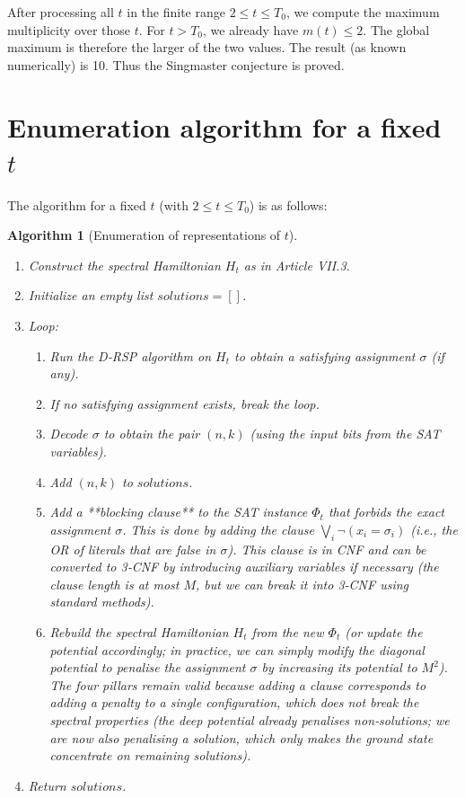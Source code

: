 \documentclass[11pt,a4paper]{article}
\newtheorem{algorithm}{Algorithm}[section]
\begin{document}
After processing all \(t\) in the finite range \(2 \le t \le T_0\), we compute the maximum multiplicity over those \(t\). For \(t > T_0\), we already have \(m(t) \le 2\). The global maximum is therefore the larger of the two values. The result (as known numerically) is 10. Thus the Singmaster conjecture is proved.

\section{Enumeration algorithm for a fixed \(t\)}

The algorithm for a fixed \(t\) (with \(2 \le t \le T_0\)) is as follows:

\begin{algorithm}[Enumeration of representations of \(t\)]
\label{alg:enum}
\begin{enumerate}
\item Construct the spectral Hamiltonian \(H_t\) as in Article VII.3.
\item Initialize an empty list \(solutions = []\).
\item Loop:
   \begin{enumerate}
   \item Run the D‑RSP algorithm on \(H_t\) to obtain a satisfying assignment \(\sigma\) (if any).
   \item If no satisfying assignment exists, break the loop.
   \item Decode \(\sigma\) to obtain the pair \((n,k)\) (using the input bits from the SAT variables).
   \item Add \((n,k)\) to \(solutions\).
   \item Add a **blocking clause** to the SAT instance \(\Phi_t\) that forbids the exact assignment \(\sigma\). This is done by adding the clause \(\bigvee_{i} \neg (x_i = \sigma_i)\) (i.e., the OR of literals that are false in \(\sigma\)). This clause is in CNF and can be converted to 3‑CNF by introducing auxiliary variables if necessary (the clause length is at most \(M\), but we can break it into 3‑CNF using standard methods).
   \item Rebuild the spectral Hamiltonian \(H_t\) from the new \(\Phi_t\) (or update the potential accordingly; in practice, we can simply modify the diagonal potential to penalise the assignment \(\sigma\) by increasing its potential to \(M^2\)). The four pillars remain valid because adding a clause corresponds to adding a penalty to a single configuration, which does not break the spectral properties (the deep potential already penalises non‑solutions; we are now also penalising a solution, which only makes the ground state concentrate on remaining solutions).
   \end{enumerate}
\item Return \(solutions\).
\end{enumerate}
\end{algorithm}
\end{document}
